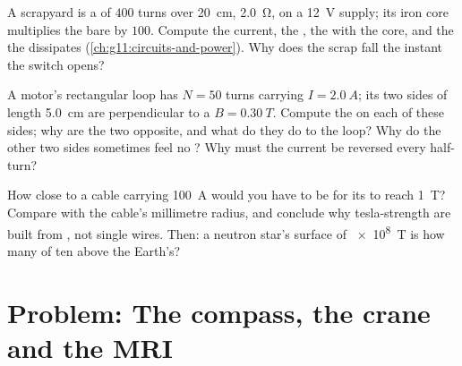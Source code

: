 \begin{exercise}[$\star\star\star$]\label{exo:g11:magnetic-fields:13}
A scrapyard  is a  of $400$ turns over \qty{20}{cm},
 \qty{2.0}{\ohm}, on a \qty{12}{V} supply; its iron core
multiplies the bare  by $100$. Compute the current, the 
, the  with the core, and the  the  dissipates
(\cref{ch:g11:circuits-and-power}). Why does the scrap fall the
instant the switch opens?
\end{exercise}

\begin{exercise}[$\star\star\star$]\label{exo:g11:magnetic-fields:14}
A motor's rectangular loop has $N = 50$ turns carrying
$I = \qty{2.0}{A}$; its two sides of length \qty{5.0}{cm} are
perpendicular to a  $B = \qty{0.30}{T}$. Compute the  on each
of these sides; why are the two  opposite, and what do they do to
the loop? Why do the other two sides sometimes feel no ? Why must
the current be reversed every half-turn?
\end{exercise}

\begin{exercise}[$\star\star\star$]\label{exo:g11:magnetic-fields:15}
How close to a cable carrying \qty{100}{A} would you have to be for
its  to reach \qty{1}{T}? Compare with the cable's millimetre
radius, and conclude why tesla-strength  are built from
, not single wires. Then: a neutron star's surface  of
\qty{e8}{T} is how many  of ten above the Earth's?
\end{exercise}

\section{Problem: The compass, the crane and the MRI}

